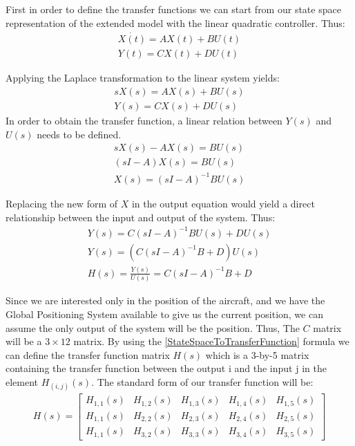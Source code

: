 \documentclass[conference]{IEEEtran}
\begin{document}
First in order to define the transfer functions we can start from our state
space representation of the extended model with the linear quadratic
controller. Thus:
\begin{align}
    \dot{X(t)}=AX(t)+BU(t) \\
    Y(t)=CX(t)+DU(t)
\end{align}
\par
Applying the Laplace transformation to the linear system yields:
\begin{align}
    s{X(s)}=AX(s)+BU(s) \\
    Y(s)=CX(s)+DU(s)
\end{align}
In order to obtain the transfer function, a linear relation between $Y(s)$ and $U(s)$ needs to be defined.
\begin{align}
    sX(s)-AX(s)=BU(s) \\
    (sI-A)X(s)=BU(s)  \\
    X(s)={(sI-A)}^{-1}BU(s)
\end{align}
\par
Replacing the new form of $X$ in the output equation would yield a direct
relationship between the input and output of the system. Thus:
\begin{align}
    Y(s)=C{(sI-A)}^{-1}BU(s)+DU(s) \\
    Y(s)=(C{(sI-A)}^{-1}B+D)U(s)   \\
    H(s)=\frac{Y(s)}{U(s)}={C(sI-A)}^{-1}B+D
    \label{StateSpaceToTransferFunction}
\end{align}
\par
Since we are interested only in the position of the aircraft, and we have the
Global Positioning System available to give us the current position, we can
assume the only output of the system will be the position. Thus, The $C$ matrix
will be a $3\times12$ matrix. By using the {\ref{StateSpaceToTransferFunction}}
formula we can define the transfer function matrix $H(s)$ which is a 3-by-5
matrix containing the transfer function between the output i and the input j in
the element $H_{(i,j)}(s)$. The standard form of our transfer function will be:
\begin{align}
    H(s)=\begin{bmatrix}
             H_{1,1}(s) & H_{1,2}(s) & H_{1,3}(s) & H_{1,4}(s) & H_{1,5}(s) \\
             H_{1,1}(s) & H_{2,2}(s) & H_{2,3}(s) & H_{2,4}(s) & H_{2,5}(s) \\
             H_{1,1}(s) & H_{3,2}(s) & H_{3,3}(s) & H_{3,4}(s) & H_{3,5}(s)
         \end{bmatrix}
\end{align}
\end{document}
